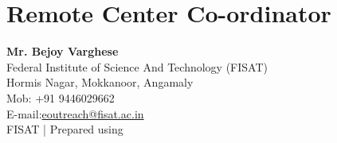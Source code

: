 \documentclass[notuble,10pt,a4paper]{leaflet}
\begin{document}
\section{{\Large Remote Center Co-ordinator}}
\textbf{Mr. Bejoy Varghese}\\
Federal Institute of Science And Technology (FISAT)\\
Hormis Nagar, Mokkanoor, Angamaly\\
Mob: +91 9446029662\\
E-mail:\url{eoutreach@fisat.ac.in}\\

\vfill
\footnotesize{\textcopyright FISAT | Prepared using \LaTeXe}



\end{document}
